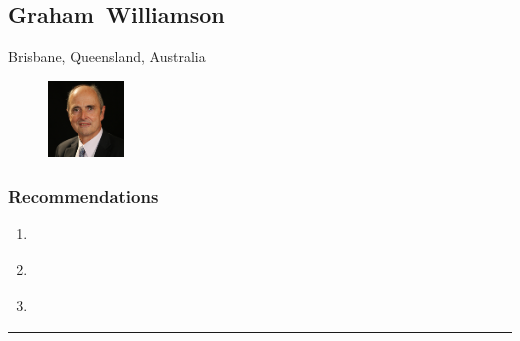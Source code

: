 \subsection{Graham~Williamson} \textsf{Brisbane, Queensland, Australia} \par \setlength{\columnsep}{0pt} \begin{figure} \centering \includegraphics[width=0.18\textwidth]{bios/gwilliamson.jpg} \end{figure}  \subsubsection{Recommendations}\begin{enumerate}
\item \cite{DTA-AUS2018}
\item \cite{NIST-USA2017}
\item \cite{Williamson2017}
\end{enumerate}\noindent\rule{\textwidth}{0.2pt}

